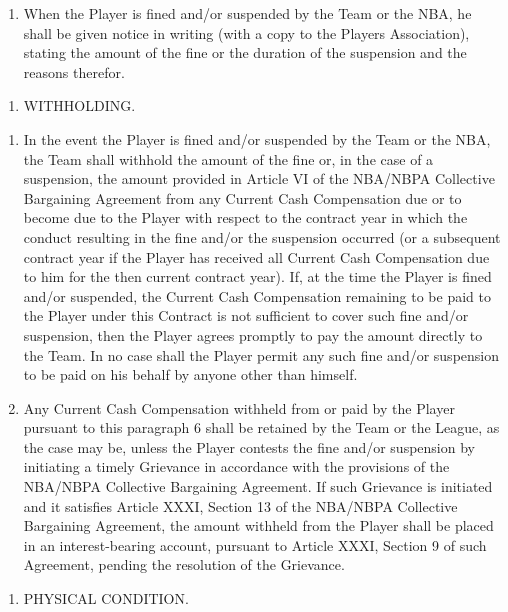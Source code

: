 \documentclass[
]{book}
\providecommand{\tightlist}{%
  \setlength{\itemsep}{0pt}\setlength{\parskip}{0pt}}
\begin{document}
\begin{enumerate}
\item
  When the Player is fined and/or suspended by the Team or the NBA, he shall be given notice in writing (with a copy to the Players Association), stating the amount of the fine or the duration of the suspension and the reasons therefor.
\end{enumerate}

\begin{enumerate}
\def\labelenumi{\arabic{enumi}.}
\setcounter{enumi}{5}
\tightlist
\item
  WITHHOLDING.
\end{enumerate}

\begin{enumerate}
\def\labelenumi{(\alph{enumi})}
\tightlist
\item
  In the event the Player is fined and/or suspended by the Team or the NBA, the Team shall withhold the amount of the fine or, in the case of a suspension, the amount provided in Article VI of the NBA/NBPA Collective Bargaining Agreement from any Current Cash Compensation due or to become due to the Player with respect to the contract year in which the conduct resulting in the fine and/or the suspension occurred (or a subsequent contract year if the Player has received all Current Cash Compensation due to him for the then current contract year). If, at the time the Player is fined and/or suspended, the Current Cash Compensation remaining to be paid to the Player under this Contract is not sufficient to cover such fine and/or suspension, then the Player agrees promptly to pay the amount directly to the Team. In no case shall the Player permit any such fine and/or suspension to be paid on his behalf by anyone other than himself.
\item
  Any Current Cash Compensation withheld from or paid by the Player pursuant to this paragraph 6 shall be retained by the Team or the League, as the case may be, unless the Player contests the fine and/or suspension by initiating a timely Grievance in accordance with the provisions of the NBA/NBPA Collective Bargaining Agreement. If such Grievance is initiated and it satisfies Article XXXI, Section 13 of the NBA/NBPA Collective Bargaining Agreement, the amount withheld from the Player shall be placed in an interest-bearing account, pursuant to Article XXXI, Section 9 of such Agreement, pending the resolution of the Grievance.
\end{enumerate}

\begin{enumerate}
\def\labelenumi{\arabic{enumi}.}
\setcounter{enumi}{6}
\tightlist
\item
  PHYSICAL CONDITION.
\end{enumerate}
\end{document}

